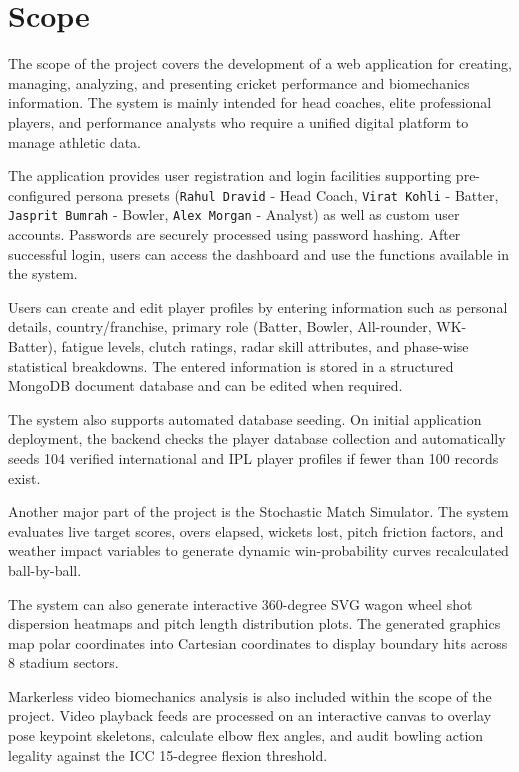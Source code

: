 \section{Scope}
The scope of the project covers the development of a web application for creating, managing, analyzing, and presenting cricket performance and biomechanics information. The system is mainly intended for head coaches, elite professional players, and performance analysts who require a unified digital platform to manage athletic data.

The application provides user registration and login facilities supporting pre-configured persona presets (\texttt{Rahul Dravid} - Head Coach, \texttt{Virat Kohli} - Batter, \texttt{Jasprit Bumrah} - Bowler, \texttt{Alex Morgan} - Analyst) as well as custom user accounts. Passwords are securely processed using password hashing. After successful login, users can access the dashboard and use the functions available in the system.

Users can create and edit player profiles by entering information such as personal details, country/franchise, primary role (Batter, Bowler, All-rounder, WK-Batter), fatigue levels, clutch ratings, radar skill attributes, and phase-wise statistical breakdowns. The entered information is stored in a structured MongoDB document database and can be edited when required.

The system also supports automated database seeding. On initial application deployment, the backend checks the player database collection and automatically seeds 104 verified international and IPL player profiles if fewer than 100 records exist.

Another major part of the project is the Stochastic Match Simulator. The system evaluates live target scores, overs elapsed, wickets lost, pitch friction factors, and weather impact variables to generate dynamic win-probability curves recalculated ball-by-ball.

The system can also generate interactive 360-degree SVG wagon wheel shot dispersion heatmaps and pitch length distribution plots. The generated graphics map polar coordinates into Cartesian coordinates to display boundary hits across 8 stadium sectors.

Markerless video biomechanics analysis is also included within the scope of the project. Video playback feeds are processed on an interactive canvas to overlay pose keypoint skeletons, calculate elbow flex angles, and audit bowling action legality against the ICC 15-degree flexion threshold.

